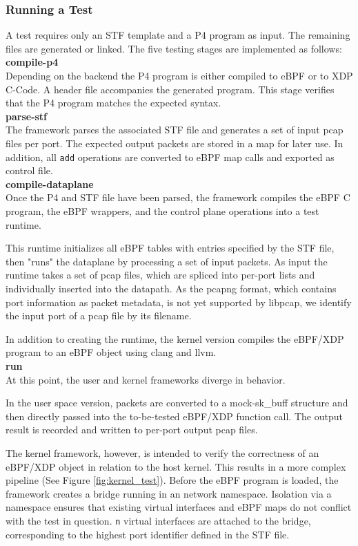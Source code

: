\subsubsection{Running a Test}
A test requires only an STF template and a P4 program as input. The 
remaining files are generated or linked. The five testing stages are 
implemented as follows:\\

\noindent\textbf{compile-p4}\\
Depending on the backend the P4 program is either compiled to eBPF or 
to XDP C-Code. A header file accompanies the generated program. This stage 
verifies that the P4 program matches the expected syntax.\\ 
\textbf{parse-stf}\\
The framework parses the associated STF file and generates a set of input pcap 
files per port. The expected output packets are stored in a map for later use. 
In addition, all \texttt{add} operations are converted to eBPF map calls and 
exported as control file.\\
\textbf{compile-dataplane}\\
Once the P4 and STF file have been parsed, the framework compiles 
the eBPF C program, the eBPF wrappers, and the control plane operations into a 
test runtime.

This runtime initializes all eBPF tables with entries specified by the STF 
file, then "runs" the dataplane by processing a set of input packets.
As input the runtime takes a set of pcap files, which are spliced into per-port 
lists and individually inserted into the datapath.
As the pcapng format, which contains port information as packet metadata, is 
not yet supported by libpcap, we identify the input port of a pcap file by
its filename.

In addition to creating the runtime, the kernel version compiles the eBPF/XDP 
program to an eBPF object using clang and llvm.\\
\textbf{run}\\
At this point, the user and kernel frameworks diverge in behavior.

In the user space version, packets are converted to a mock-sk\_buff structure 
and then directly passed into the to-be-tested eBPF/XDP function call. The 
output result is recorded and written to per-port output pcap files.

The kernel framework, however, is intended to verify the correctness of an 
eBPF/XDP object in relation to the host kernel. This results in a more complex 
pipeline (See Figure \ref{fig:kernel_test}). 
Before the eBPF program is loaded, the framework creates a bridge running in an 
network namespace. Isolation via a namespace ensures that existing 
virtual interfaces and eBPF maps do not conflict with the test in question.
\texttt{n} virtual interfaces are attached to the bridge, corresponding to 
the highest port identifier defined in the STF file.

